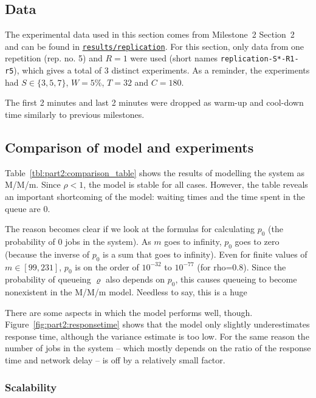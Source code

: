 \documentclass[11pt]{article}
\begin{document}
\subsection{Data}

The experimental data used in this section comes from Milestone~2 Section~2 and can be found in \texttt{\href{https://gitlab.inf.ethz.ch/pungast/asl-fall16-project/tree/master/results/replication}{results/replication}}. For this section, only data from one repetition (rep. no. 5) and $R=1$ were used (short names \texttt{replication-S*-R1-r5}), which gives a total of 3 distinct experiments. As a reminder, the experiments had $S \in \{3,5,7\}$, $W=5\%$, $T=32$ and $C=180$.

The first 2 minutes and last 2 minutes were dropped as warm-up and cool-down time similarly to previous milestones.

\subsection{Comparison of model and experiments}



Table~\ref{tbl:part2:comparison_table} shows the results of modelling the system as M/M/m. Since $\rho < 1$, the model is stable for all cases. However, the table reveals an important shortcoming of the model: waiting times and the time spent in the queue are 0.

The reason becomes clear if we look at the formulas for calculating $p_0$ (the probability of 0 jobs in the system). As $m$ goes to infinity, $p_0$ goes to zero (because the inverse of $p_0$ is a sum that goes to infinity). Even for finite values of $m \in [99, 231]$, $p_0$ is on the order of $10^{-32}$ to $10^{-77}$ (for rho=0.8). Since the probability of queueing $\varrho$ also depends on $p_0$, this causes queueing to become nonexistent in the M/M/m model. Needless to say, this is a huge 

There are some aspects in which the model performs well, though. Figure~\ref{fig:part2:responsetime} shows that the model only slightly underestimates response time, although the variance estimate is too low. For the same reason the number of jobs in the system -- which mostly depends on the ratio of the response time and network delay -- is off by a relatively small factor.

\subsubsection{Scalability}
\end{document}
